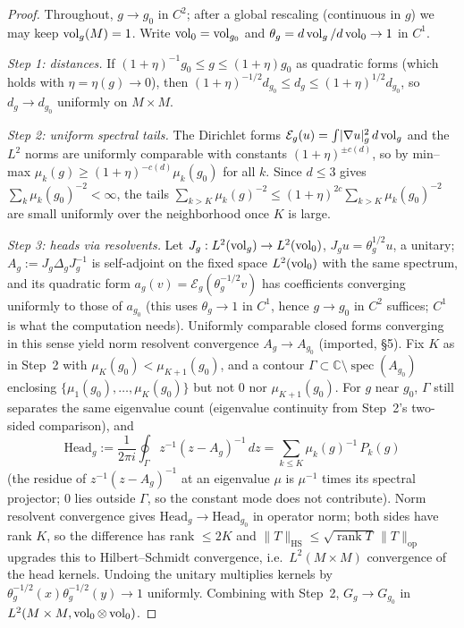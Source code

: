 \begin{proof}
Throughout, $g\to g_0$ in $C^2$; after a global rescaling (continuous in $g$) we may
keep $\operatorname{vol}_g(M)=1$. Write $\operatorname{vol}_0=\operatorname{vol}_{g_0}$ and
$\theta_g=d\operatorname{vol}_g/d\operatorname{vol}_0\to1$ in $C^1$.

\emph{Step 1: distances.} If $(1+\eta)^{-1}g_0\le g\le(1+\eta)g_0$ as quadratic forms
(which holds with $\eta=\eta(g)\to0$), then
$(1+\eta)^{-1/2}d_{g_0}\le d_g\le(1+\eta)^{1/2}d_{g_0}$, so $d_g\to d_{g_0}$ uniformly
on $M\times M$.

\emph{Step 2: uniform spectral tails.} The Dirichlet forms
$\mathcal E_g(u)=\int\lvert\nabla u\rvert_g^2\,d\operatorname{vol}_g$ and the $L^2$ norms are
uniformly comparable with constants $(1+\eta)^{\pm c(d)}$, so by min--max
$\mu_k(g)\ge(1+\eta)^{-c(d)}\mu_k(g_0)$ for all $k$. Since $d\le3$ gives
$\sum_k\mu_k(g_0)^{-2}<\infty$, the tails
$\sum_{k>K}\mu_k(g)^{-2}\le(1+\eta)^{2c}\sum_{k>K}\mu_k(g_0)^{-2}$ are small uniformly
over the neighborhood once $K$ is large.

\emph{Step 3: heads via resolvents.} Let $J_g:L^2(\operatorname{vol}_g)\to L^2(\operatorname{vol}_0)$,
$J_gu=\theta_g^{1/2}u$, a unitary; $A_g:=J_g\Delta_gJ_g^{-1}$ is self-adjoint on the
fixed space $L^2(\operatorname{vol}_0)$ with the same spectrum, and its quadratic form
$a_g(v)=\mathcal E_g(\theta_g^{-1/2}v)$ has coefficients converging uniformly to those
of $a_{g_0}$ (this uses $\theta_g\to1$ in $C^1$, hence $g\to g_0$ in $C^2$ suffices;
$C^1$ is what the computation needs). Uniformly comparable closed forms converging in
this sense yield norm resolvent convergence $A_g\to A_{g_0}$ (imported, \S5). Fix $K$
as in Step~2 with $\mu_K(g_0)<\mu_{K+1}(g_0)$, and a contour
$\Gamma\subset\mathbb C\setminus\operatorname{spec}(A_{g_0})$ enclosing
$\{\mu_1(g_0),\dots,\mu_K(g_0)\}$ but not $0$ nor $\mu_{K+1}(g_0)$. For $g$ near
$g_0$, $\Gamma$ still separates the same eigenvalue count (eigenvalue continuity from
Step~2's two-sided comparison), and
\[
\mathrm{Head}_g:=\frac{1}{2\pi i}\oint_\Gamma z^{-1}(z-A_g)^{-1}\,dz
=\sum_{k\le K}\mu_k(g)^{-1}\,P_k(g)
\]
(the residue of $z^{-1}(z-A_g)^{-1}$ at an eigenvalue $\mu$ is $\mu^{-1}$ times its
spectral projector; $0$ lies outside $\Gamma$, so the constant mode does not
contribute). Norm resolvent convergence gives
$\mathrm{Head}_g\to\mathrm{Head}_{g_0}$ in operator norm; both sides have rank $K$, so
the difference has rank $\le2K$ and
$\lVert T\rVert_{\mathrm{HS}}\le\sqrt{\operatorname{rank}T}\,\lVert T\rVert_{\mathrm{op}}$
upgrades this to Hilbert--Schmidt convergence, i.e.\ $L^2(M\times M)$ convergence of
the head kernels. Undoing the unitary multiplies kernels by
$\theta_g^{-1/2}(x)\theta_g^{-1/2}(y)\to1$ uniformly. Combining with Step~2,
$G_g\to G_{g_0}$ in $L^2(M\times M,\operatorname{vol}_0\otimes\operatorname{vol}_0)$.


\end{proof}
